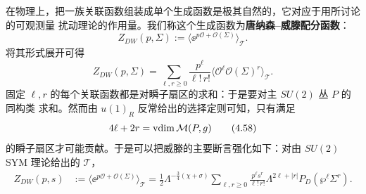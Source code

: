 在物理上，把一族关联函数组装成单个生成函数是极其自然的，它对应于用所讨论的可观测量
扰动理论的作用量。我们称这个生成函数为\textbf{唐纳森--威滕配分函数}：
\begin{equation}
  Z_{DW}(p,\Sigma):=\bigl\langle\ee^{p\mathcal{O}+\mathcal{O}(\Sigma)}
  \bigr\rangle_{\mathcal{T}}.
  \tag{4.56}
\end{equation}
将其形式展开可得
\begin{equation}
  Z_{DW}(p,\Sigma)
  =\sum_{\ell,r\ge0}\frac{p^{\ell}}{\ell!\,r!}
  \bigl\langle\mathcal{O}^{\ell}\mathcal{O}(\Sigma)^{r}\bigr\rangle_{\mathcal{T}}.
  \tag{4.57}
\end{equation}
固定 $\ell,r$ 的每个关联函数都是对瞬子扇区的求和：于是要对主 $SU(2)$ 丛 $P$ 的同构类
求和。然而由 $u(1)_R$ 反常给出的选择定则可知，只有满足
\begin{equation}
  4\ell+2r=\operatorname{vdim}\mathcal{M}(P,g)
  \tag{4.58}
\end{equation}
的瞬子扇区才可能贡献。于是可以把威滕的主要断言强化如下：对由 $SU(2)$ SYM 理论给出的
$\mathcal{T}$，
\begin{equation}
  \begin{aligned}
    Z_{DW}(p,s)
    &:=\bigl\langle\ee^{p\mathcal{O}+\mathcal{O}(\Sigma)}\bigr\rangle_{\mathcal{T}}
    =\frac{1}{2}\Lambda^{-\frac{3}{4}(\chi+\sigma)}
    \sum_{\ell,r\ge0}\frac{p^{\ell}s^{r}}{\ell!\,r!}
    \Lambda^{2\ell+|r|}P_{D}(\wp^{\ell}\Sigma^{r}).
  \end{aligned}
  \tag{4.59}
\end{equation}


